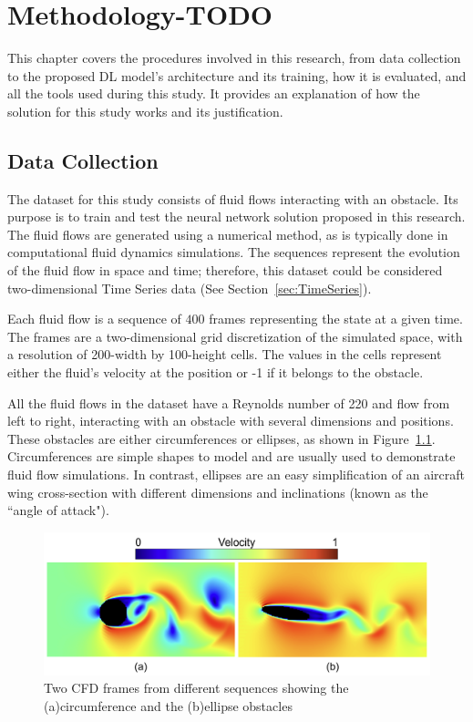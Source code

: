 
\chapter{Methodology-TODO}
\label{ch:Methodology}
This chapter covers the procedures involved in this research, from data collection to the proposed DL model's architecture and its training, how it is evaluated, and all the tools used during this study. It provides an explanation of how the solution for this study works and its justification.

\section{Data Collection}
\label{sec:DataCollection}
The dataset for this study consists of fluid flows interacting with an obstacle. Its purpose is to train and test the neural network solution proposed in this research. The fluid flows are generated using a numerical method, as is typically done in computational fluid dynamics simulations. The sequences represent the evolution of the fluid flow in space and time; therefore, this dataset could be considered two-dimensional Time Series data (See Section~\ref{sec:TimeSeries}).

Each fluid flow is a sequence of $400$ frames representing the state at a given time. The frames are a two-dimensional grid discretization of the simulated space, with a resolution of 200-width by 100-height cells. The values in the cells represent either the fluid's velocity at the position or -1 if it belongs to the obstacle. 

All the fluid flows in the dataset have a Reynolds number of 220 and flow from left to right, interacting with an obstacle with several dimensions and positions. These obstacles are either circumferences or ellipses, as shown in Figure~\ref{fig:cfd_obstacles}. Circumferences are simple shapes to model and are usually used to demonstrate fluid flow simulations. In contrast, ellipses are an easy simplification of an aircraft wing cross-section with different dimensions and inclinations (known as the ``angle of attack").

\begin{figure}[!h]
    \centering
    \includegraphics[width=0.9\linewidth]{images/cfd_obstacle_examples.png}
    \caption{Two CFD frames from different sequences showing the (a)circumference and the (b)ellipse obstacles}
    \label{fig:cfd_obstacles}
\end{figure}

